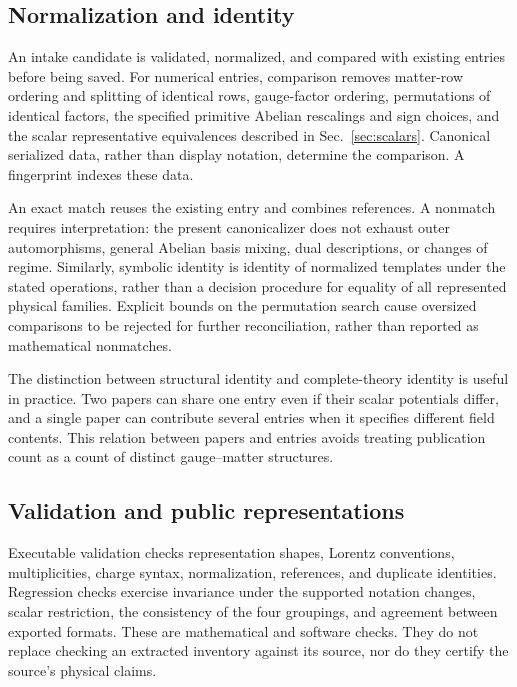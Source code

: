 \subsection{Normalization and identity}

An intake candidate is validated, normalized, and compared with existing entries before being saved. For numerical entries, comparison removes matter-row ordering and splitting of identical rows, gauge-factor ordering, permutations of identical factors, the specified primitive Abelian rescalings and sign choices, and the scalar representative equivalences described in Sec.~\ref{sec:scalars}. Canonical serialized data, rather than display notation, determine the comparison. A fingerprint indexes these data.

An exact match reuses the existing entry and combines references. A nonmatch requires interpretation: the present canonicalizer does not exhaust outer automorphisms, general Abelian basis mixing, dual descriptions, or changes of regime. Similarly, symbolic identity is identity of normalized templates under the stated operations, rather than a decision procedure for equality of all represented physical families. Explicit bounds on the permutation search cause oversized comparisons to be rejected for further reconciliation, rather than reported as mathematical nonmatches.

The distinction between structural identity and complete-theory identity is useful in practice. Two papers can share one entry even if their scalar potentials differ, and a single paper can contribute several entries when it specifies different field contents. This relation between papers and entries avoids treating publication count as a count of distinct gauge--matter structures.

\subsection{Validation and public representations}

Executable validation checks representation shapes, Lorentz conventions, multiplicities, charge syntax, normalization, references, and duplicate identities. Regression checks exercise invariance under the supported notation changes, scalar restriction, the consistency of the four groupings, and agreement between exported formats. These are mathematical and software checks. They do not replace checking an extracted inventory against its source, nor do they certify the source's physical claims.


